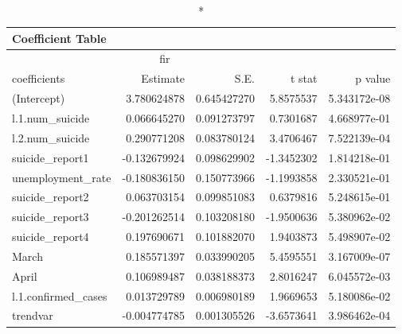 \begin{longtable}{lrrrr}
\caption*{
{\large Coefficient Table}
} \\ 
\toprule
\multicolumn{4}{c}{fir} &  \\ 
\cmidrule(lr){1-4}
coefficients & Estimate & S.E. & t stat & p value \\ 
\midrule
(Intercept) & 3.780624878 & 0.645427270 & 5.8575537 & 5.343172e-08 \\ 
l.1.num\_suicide & 0.066645270 & 0.091273797 & 0.7301687 & 4.668977e-01 \\ 
l.2.num\_suicide & 0.290771208 & 0.083780124 & 3.4706467 & 7.522139e-04 \\ 
suicide\_report1 & -0.132679924 & 0.098629902 & -1.3452302 & 1.814218e-01 \\ 
unemployment\_rate & -0.180836150 & 0.150773966 & -1.1993858 & 2.330521e-01 \\ 
suicide\_report2 & 0.063703154 & 0.099851083 & 0.6379816 & 5.248615e-01 \\ 
suicide\_report3 & -0.201262514 & 0.103208180 & -1.9500636 & 5.380962e-02 \\ 
suicide\_report4 & 0.197690671 & 0.101882070 & 1.9403873 & 5.498907e-02 \\ 
March & 0.185571397 & 0.033990205 & 5.4595551 & 3.167009e-07 \\ 
April & 0.106989487 & 0.038188373 & 2.8016247 & 6.045572e-03 \\ 
l.1.confirmed\_cases & 0.013729789 & 0.006980189 & 1.9669653 & 5.180086e-02 \\ 
trendvar & -0.004774785 & 0.001305526 & -3.6573641 & 3.986462e-04 \\ 
\bottomrule
\end{longtable}

